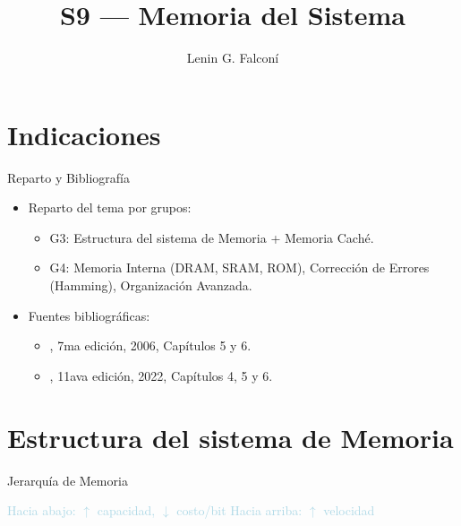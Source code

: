 \documentclass[table, aspectratio=169]{beamer}
\author{Lenin G. Falconí}
\date{}
\title{S9 — Memoria del Sistema}
\begin{document}
\maketitle

\section{Indicaciones}
\label{sec:org8a8f8af}
\begin{frame}[label={sec:org40ff79e}]{Reparto y Bibliografía}
\begin{itemize}
\item Reparto del tema por grupos:
\begin{itemize}
\item \alert{G3:} Estructura del sistema de Memoria + Memoria Caché.
\item \alert{G4:} Memoria Interna (DRAM, SRAM, ROM), Corrección de Errores (Hamming), Organización Avanzada.
\end{itemize}
\item Fuentes bibliográficas:
\begin{itemize}
\item \textcite{stallings2006esp}, 7ma edición, 2006, Capítulos 5 y 6.
\item \textcite{stallings2022computer}, 11ava edición, 2022, Capítulos 4, 5 y 6.
\end{itemize}
\end{itemize}
\end{frame}

\section{Estructura del sistema de Memoria}
\label{sec:org97dfd22}
\begin{frame}[label={sec:orgab37af6}]{Jerarquía de Memoria}
\begin{center}
\end{center}
\vspace{2mm}
\begin{center}\scriptsize\textcolor{LightBlue}{
  Hacia abajo: $\uparrow$ capacidad, $\downarrow$ costo/bit \quad\vline\quad
  Hacia arriba: $\uparrow$ velocidad}
\end{center}
\end{frame}
\end{document}
